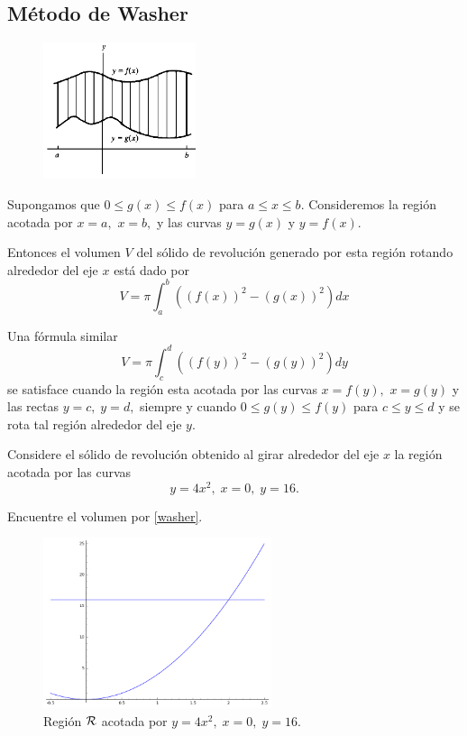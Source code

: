 \subsection{M\'etodo de Washer}


\begin{figure}
 \centering
 \includegraphics[height=4cm]{./calculo/fig3006.png}
 \label{fig:3006}
\end{figure}

Supongamos que $0\leq g(x) \leq f(x)$ para $a\leq x \leq b.$ Consideremos la regi\'on acotada por $x=a,$ $x=b,$ y las curvas $y=g(x)$ y $y=f(x).$

Entonces el volumen $V$ del s\'olido de revoluci\'on generado por esta regi\'on rotando alrededor del eje $x$ está dado por
\[
 \label{washer}
 \tag{Washer}
 V=\pi\int_{a}^{b}\left( (f(x))^{2}-(g(x))^{2} \right)dx
\]




Una f\'ormula similar
\[
 \label{washer:2}
 \tag{Washer (II)}
 V=\pi\int_{c}^{d}\left( (f(y))^{2}-(g(y))^{2} \right)dy
\]
se satisface cuando la regi\'on esta acotada por las curvas $x=f(y),$ $x=g(y)$ y las rectas $y=c,\; y=d,$ siempre y cuando $0\leq g(y) \leq f(y)$ para $c\leq y \leq d$ y se rota tal regi\'on alrededor del eje $y.$



\begin{resuelto}
 \label{exmp:30.3}
 Considere el s\'olido de revoluci\'on obtenido al girar  alrededor del eje $x$ la regi\'on acotada por las curvas $$y=4x^{2}, \; x=0, \;y=16.$$

Encuentre el volumen por \eqref{washer}.
\end{resuelto}




\begin{figure}
 \centering
 \includegraphics[height=5cm]{./calculo/sage0503.png}
 \caption{Regi\'on $\mathcal{R}$ acotada por $y=4x^{2}, \; x=0, \;y=16.$}
 \label{fig:sage:0503}
\end{figure}




